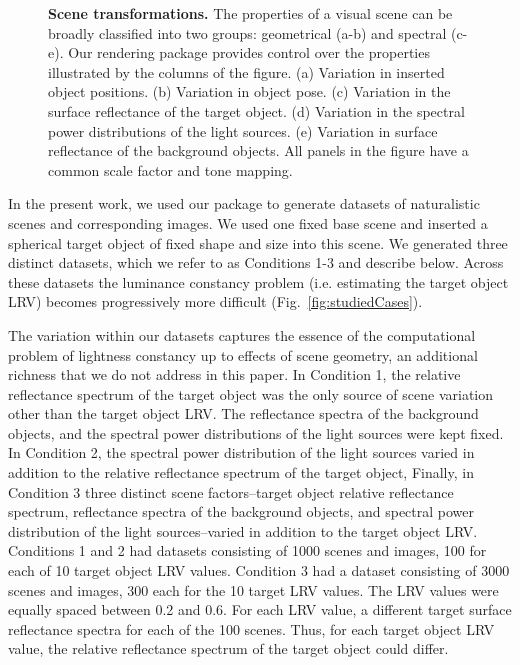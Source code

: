 \documentclass{jov}
\begin{document}
\begin{figure}
    \caption{{\bf Scene transformations.} The properties of a visual scene can be broadly classified into two groups: geometrical (a-b) and spectral (c-e). Our rendering package provides control over the properties illustrated by the columns of the figure. (a) Variation in inserted object positions. (b) Variation in object pose. (c) Variation in the surface reflectance of the target object. (d) Variation in the spectral power distributions of the light sources. (e) Variation in surface reflectance of the background objects. All panels in the figure have a common scale factor and tone mapping.
\label{fig:VWCCTransformations}}
\end{figure}

In the present work, we used our package to generate datasets of naturalistic scenes and corresponding images.
We used one fixed base scene and inserted a spherical target object of fixed shape and size into this scene.
We generated three distinct datasets, which we refer to as Conditions 1-3 and describe below.
Across these datasets the luminance constancy problem (i.e. estimating the target object LRV)
becomes progressively more difficult (Fig.~\ref{fig:studiedCases}).

The variation within our datasets captures the essence of the computational problem of lightness constancy
up to effects of scene geometry, an additional richness that we do not address in this paper.
In Condition 1, the relative reflectance spectrum of the target object was the only source of scene variation other than the target object LRV.
The reflectance spectra of the background objects, and the spectral power distributions of the light sources were kept fixed.
In Condition 2, the spectral power distribution of the light sources varied in addition to the relative reflectance spectrum of the target object,
Finally, in Condition 3 three distinct scene factors--target object relative reflectance spectrum, reflectance spectra of the background objects, and
spectral power distribution of the light sources--varied in addition to the target object LRV.
Conditions 1 and 2 had datasets consisting of 1000 scenes and images, 100 for each of 10 target object LRV values. 
Condition 3 had a dataset consisting of 3000 scenes and images, 300 each for the 10 target LRV values.
The LRV values were equally spaced between 0.2 and 0.6. For each LRV value, a different target surface reflectance spectra for each of the 100 scenes. Thus, for each target object LRV value, the relative reflectance spectrum of the target object could differ.
\end{document}
